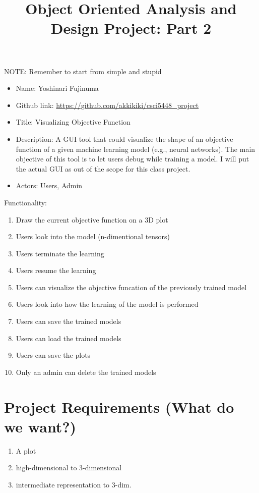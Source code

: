 \documentclass[11pt]{article}
\begin{document}
\vspace{-1cm}
\title{\vspace{-2ex} Object Oriented Analysis and Design Project: Part 2\vspace{-2ex}}
\date{\vspace{-6ex}}
\maketitle

NOTE: Remember to start from simple and stupid

\begin{itemize}
 \item Name: Yoshinari Fujinuma
 \item Github link: \url{https://github.com/akkikiki/csci5448_project}
 \item Title: Visualizing Objective Function
 \item Description: A GUI tool that could visualize the shape of an objective function of a given machine learning model (e.g., neural networks). The main objective of this tool is to let users debug while training a model. I will put the actual GUI as out of the scope for this class project. 
 \item Actors: Users, Admin
\end{itemize}

Functionality:
\begin{enumerate}[leftmargin=4\parindent]
 \item Draw the current objective function on a 3D plot
 \item Users look into the model (n-dimentional tensors)
 \item Users terminate the learning
 \item Users resume the learning
 \item Users can visualize the objective funcation of the previously trained model
 \item Users look into how the learning of the model is performed
 \item Users can save the trained models
 \item Users can load the trained models
 \item Users can save the plots
 \item Only an admin can delete the trained models
\end{enumerate}

\section{Project Requirements (What do we want?)}
\begin{enumerate}[leftmargin=4\parindent]
 \item A plot
 \item high-dimensional to 3-dimensional
 \item intermediate representation to 3-dim.
\end{enumerate}
\end{document}
